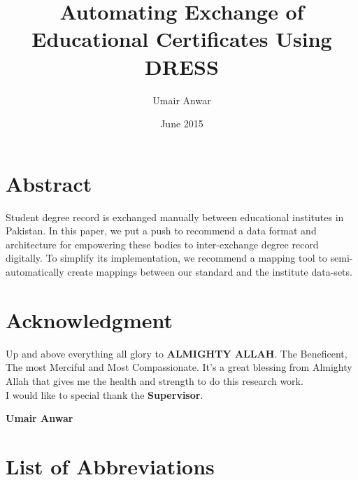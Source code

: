 \documentclass[12pt,a4paper,oneside]{book} %
\title{Automating Exchange of Educational Certificates Using DRESS}
\author{Umair Anwar}
\date{{June 2015}}
\begin{document}
\maketitle


\chapter*{Abstract}

 Student degree record is exchanged manually between educational institutes in Pakistan. In this paper, we put a push to recommend a data format and architecture for empowering these bodies to inter-exchange degree record digitally. To simplify its implementation, we recommend a mapping tool to semi-automatically create mappings between our standard and the institute data-sets.

\certificateoforiginality
\chapter*{Acknowledgment}
Up and above everything all glory to {\bfseries ALMIGHTY ALLAH}. The Beneficent, The most Merciful and Most Compassionate. It's a great blessing from Almighty Allah that gives me the health and strength to do this research work.\\

I would like to special thank the {\bfseries Supervisor}. \\

\begin{flushright} \textbf{Umair Anwar} \end{flushright}

\tableofcontents
%
%
%
\chapter*{List of Abbreviations}
\end{document}
